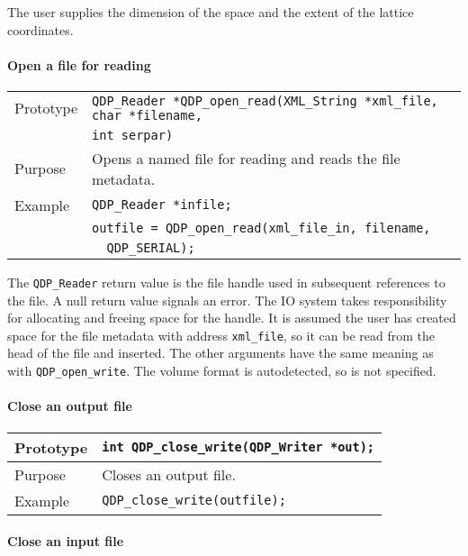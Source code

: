 \documentclass{article}
\newcommand{\QMDhandle}{{\tt XML\_String}}
\begin{document}
The user supplies the dimension of the space and the extent of the
lattice coordinates.

\paragraph{Open a file for reading}

\begin{flushleft}
  \begin{tabular}{|l|l|}
  \hline
  Prototype      & \verb|QDP_Reader *QDP_open_read(|\QMDhandle \verb| *xml_file, char *filename,|\\
                 & \verb|int serpar)|\\
    \hline
  Purpose        & Opens a named file for reading and reads the file metadata. \\
\hline
  Example  & \verb|QDP_Reader *infile;| \\
           & \verb|outfile = QDP_open_read(xml_file_in, filename, |\\
	   & \verb|  QDP_SERIAL);| \\
   \hline
 \end{tabular}
\end{flushleft}
%
The \verb|QDP_Reader| return value is the file handle used in
subsequent references to the file.  A null return value signals an
error. The IO system takes responsibility for allocating and freeing
space for the handle.  It is assumed the user has created space for
the file metadata with address \verb|xml_file|, so it can be read from
the head of the file and inserted.  The other arguments have the same
meaning as with \verb|QDP_open_write|.  The volume format is
autodetected, so is not specified.
%
\paragraph{Close an output file}

\begin{flushleft}
  \begin{tabular}{|l|l|}
  \hline
  Prototype      & \verb|int QDP_close_write(QDP_Writer *out);| \\
    \hline
  Purpose        & Closes an output file. \\
\hline
  Example        & \verb|QDP_close_write(outfile);|\\
   \hline
 \end{tabular}
\end{flushleft}
%
\paragraph{Close an input file}
\end{document}
